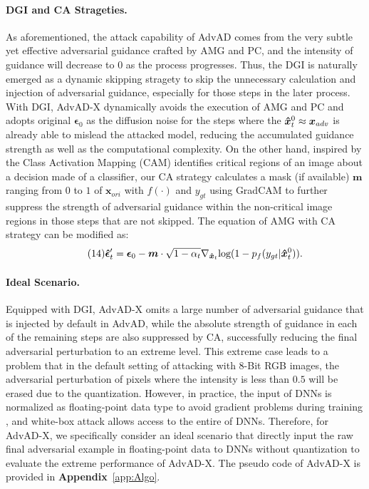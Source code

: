 \documentclass{article}
\begin{document}
\paragraph{DGI and CA Strageties.} As aforementioned, the attack capability of AdvAD comes from the very subtle yet effective adversarial guidance crafted by AMG and PC, and the intensity of guidance will decrease to 0 as the process progresses. Thus, the DGI is naturally emerged as a dynamic skipping stragety to skip the unnecessary calculation and injection of adversarial guidance, especially for those steps in the later process. With DGI, AdvAD-X dynamically avoids the execution of AMG and PC and adopts original $\boldsymbol{\epsilon}_0$ as the diffusion noise for the steps where the $\boldsymbol{\Hat{x}}_{t}^{0} \approx \boldsymbol{x}_{adv}$ is already able to mislead the attacked model, reducing the accumulated guidance strength as well as the computational complexity. On the other hand, inspired by the Class Activation Mapping (CAM) \cite{zhou2016learning} identifies critical regions of an image about a decision made of a classifier, our CA strategy calculates a mask (if available) $\boldsymbol{m}$ ranging from $0$ to $1$ of $\boldsymbol{x}_{ori}$ with $f(\cdot)$ and $y_{gt}$ using GradCAM \cite{selvaraju2017grad} to further suppress the strength of adversarial guidance within the non-critical image regions in those steps that are not skipped. The equation of AMG with CA strategy can be modified as:
\begin{equation}\tag{14}
    \boldsymbol{\hat{\epsilon}}'_t = \boldsymbol{\epsilon}_0 - \boldsymbol{m} \cdot \sqrt{1-\alpha_t}\nabla_{\boldsymbol{\Hat{x}}_t}\text{log}(1-p_f(y_{gt}|\boldsymbol{\Hat{x}}_{t}^{0})).
\label{maineq:14}
\end{equation}
\paragraph{Ideal Scenario.} Equipped with DGI, AdvAD-X omits a large number of adversarial guidance that is injected by default in AdvAD, while the absolute strength of guidance in each of the remaining steps are also suppressed by CA, successfully reducing the final adversarial perturbation to an extreme level. This extreme case leads to a problem that in the default setting of attacking with 8-Bit RGB images, the adversarial perturbation of pixels where the intensity is less than $0.5$ will be erased due to the quantization. However, in practice, the input of DNNs is normalized as floating-point data type to avoid gradient problems during training \cite{krizhevsky2012imagenet, ioffe2015batch}, and white-box attack allows access to the entire of DNNs. Therefore, for AdvAD-X, we specifically consider an ideal scenario that directly input the raw final adversarial example in floating-point data to DNNs without quantization to evaluate the extreme performance of AdvAD-X. The pseudo code of AdvAD-X is provided in \textbf{Appendix}~\ref{app:Algo}.
\end{document}
